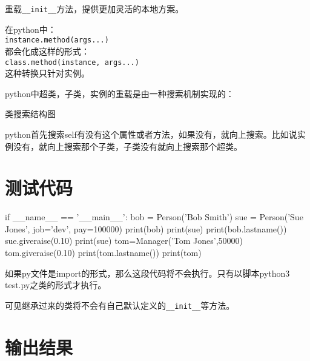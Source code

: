 \documentclass[11pt,oneside]{book}
\begin{document}
\begin{common-format}
重载\verb+__init__+方法，提供更加灵活的本地方案。

在python中：\\
\verb+instance.method(args...)+\\
都会化成这样的形式：\\
\verb+class.method(instance, args...)+\\
这种转换只针对实例。

python中超类，子类，实例的重载是由一种搜索机制实现的：
\begin{fig}{类搜索结构图}
\label{fig:类搜索结构图}
\end{fig}
python首先搜索self有没有这个属性或者方法，如果没有，就向上搜索。比如说实例没有，就向上搜索那个子类，子类没有就向上搜索那个超类。



\section{测试代码}
\begin{python}
if __name__ == '__main__':
    bob = Person('Bob Smith')
    sue = Person('Sue Jones', job='dev', pay=100000)
    print(bob)
    print(sue)
    print(bob.lastname())
    sue.giveraise(0.10)
    print(sue)
    tom=Manager('Tom Jones',50000)
    tom.giveraise(0.10)
    print(tom.lastname())
    print(tom)
\end{python}
如果py文件是import的形式，那么这段代码将不会执行。只有以脚本python3 test.py之类的形式才执行。

可见继承过来的类将不会有自己默认定义的\verb+__init__+等方法。

\section{输出结果}









\end{common-format}
\end{document}
